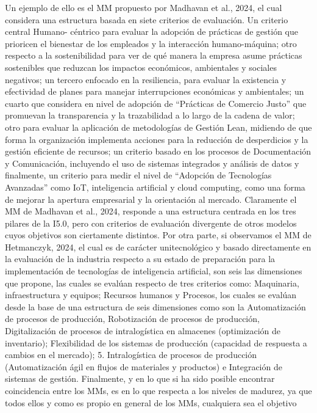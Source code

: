 \documentclass{article}
\begin{document}
Un ejemplo de ello es el MM propuesto por Madhavan et al., 2024, el cual
considera una estructura basada en siete criterios de evaluación. Un
criterio central Humano- céntrico para evaluar la adopción de prácticas
de gestión que prioricen el bienestar de los empleados y la interacción
humano-máquina; otro respecto a la sostenibilidad para ver de qué manera
la empresa asume prácticas sostenibles que reduzcan los impactos
económicos, ambientales y sociales negativos; un tercero enfocado en la
resiliencia, para evaluar la existencia y efectividad de planes para
manejar interrupciones económicas y ambientales; un cuarto que considera
en nivel de adopción de ``Prácticas de Comercio Justo'' que promuevan la
transparencia y la trazabilidad a lo largo de la cadena de valor; otro
para evaluar la aplicación de metodologías de Gestión Lean, midiendo de
que forma la organización implementa acciones para la reducción de
desperdicios y la gestión eficiente de recursos; un criterio basado en
los procesos de Documentación y Comunicación, incluyendo el uso de
sistemas integrados y análisis de datos y finalmente, un criterio para
medir el nivel de ``Adopción de Tecnologías Avanzadas'' como IoT,
inteligencia artificial y cloud computing, como una forma de mejorar la
apertura empresarial y la orientación al mercado. Claramente el MM de
Madhavan et al., 2024, responde a una estructura centrada en los tres
pilares de la I5.0, pero con criterios de evaluación divergente de otros
modelos cuyos objetivos son ciertamente distintos. Por otra parte, si
observamos el MM de Hetmanczyk, 2024, el cual es de carácter
unitecnológico y basado directamente en la evaluación de la industria
respecto a su estado de preparación para la implementación de
tecnologías de inteligencia artificial, son seis las dimensiones que
propone, las cuales se evalúan respecto de tres criterios como:
Maquinaria, infraestructura y equipos; Recursos humanos y Procesos, los
cuales se evalúan desde la base de una estructura de seis dimensiones
como son la Automatización de procesos de producción, Robotización de
procesos de producción, Digitalización de procesos de intralogística en
almacenes (optimización de inventario); Flexibilidad de los sistemas de
producción (capacidad de respuesta a cambios en el mercado); 5.
Intralogística de procesos de producción (Automatización ágil en flujos
de materiales y productos) e Integración de sistemas de gestión.
Finalmente, y en lo que si ha sido posible encontrar coincidencia entre
los MMs, es en lo que respecta a los niveles de madurez, ya que todos
ellos y como es propio en general de los MMs, cualquiera sea el objetivo
\end{document}
